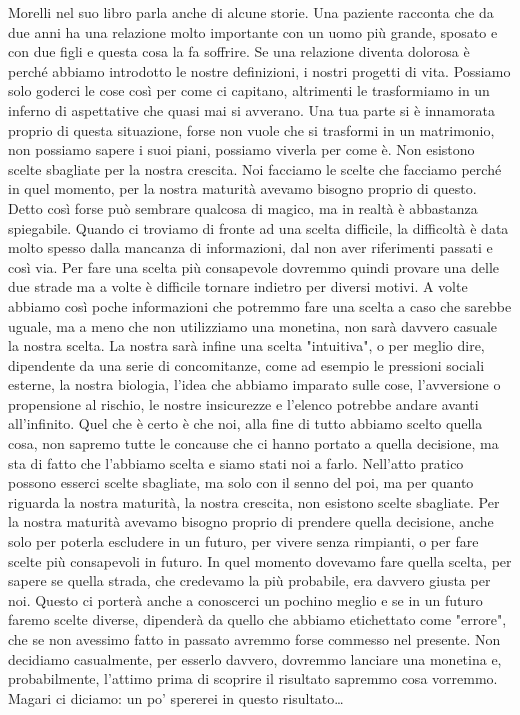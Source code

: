 \documentclass[12pt]{book} %
\begin{document}
Morelli nel suo libro parla anche di alcune storie. Una paziente racconta che da due anni ha una relazione molto
importante con un uomo più grande, sposato e con due figli e questa cosa la fa soffrire. Se una relazione diventa
dolorosa è perché abbiamo introdotto le nostre definizioni, i nostri progetti di vita. Possiamo solo goderci le cose
così per come ci capitano, altrimenti le trasformiamo in un inferno di aspettative che quasi mai si avverano. Una tua
parte si è innamorata proprio di questa situazione, forse non vuole che si trasformi in un matrimonio, non possiamo
sapere i suoi piani, possiamo viverla per come è. Non esistono scelte sbagliate per la nostra crescita. Noi facciamo le
scelte che facciamo perché in quel momento, per la nostra maturità avevamo bisogno proprio di questo. 
Detto così forse può sembrare qualcosa di magico, ma in realtà è abbastanza spiegabile. Quando ci troviamo di fronte ad una scelta difficile, la difficoltà è data molto spesso dalla mancanza di informazioni, dal non aver riferimenti passati e così via. Per fare una scelta più consapevole dovremmo quindi provare una delle due strade ma a volte è difficile tornare indietro per diversi motivi. A volte abbiamo così poche informazioni che potremmo fare una scelta a caso che sarebbe uguale, ma a meno che non utilizziamo una monetina, non sarà davvero casuale la nostra scelta. La nostra sarà infine una scelta "intuitiva", o per meglio dire, dipendente da una serie di concomitanze, come ad esempio le pressioni sociali esterne, la nostra biologia, l'idea che abbiamo imparato sulle cose, l'avversione o propensione al rischio, le nostre insicurezze e l'elenco potrebbe andare avanti all'infinito. Quel che è certo è che noi, alla fine di tutto abbiamo scelto quella cosa, non sapremo tutte le concause che ci hanno portato a quella decisione, ma sta di fatto che l'abbiamo scelta e siamo stati noi a farlo. Nell'atto pratico possono esserci scelte sbagliate, ma solo con il senno del poi, ma per quanto riguarda la nostra maturità, la nostra crescita, non esistono scelte sbagliate. Per la nostra maturità avevamo bisogno proprio di prendere quella decisione, anche solo per poterla escludere in un futuro, per vivere senza rimpianti, o per fare scelte più consapevoli in futuro. In quel momento dovevamo fare quella scelta, per sapere se quella strada, che credevamo la più probabile, era davvero giusta per noi. Questo ci porterà anche a conoscerci un pochino meglio e se in un futuro faremo scelte diverse, dipenderà da quello che abbiamo etichettato come "errore", che se non avessimo fatto in passato avremmo forse commesso nel presente. Non decidiamo casualmente, per esserlo davvero, dovremmo lanciare una monetina e, probabilmente, l'attimo prima di scoprire il risultato sapremmo cosa vorremmo. Magari ci diciamo: un po' spererei in questo risultato… 
\end{document}
